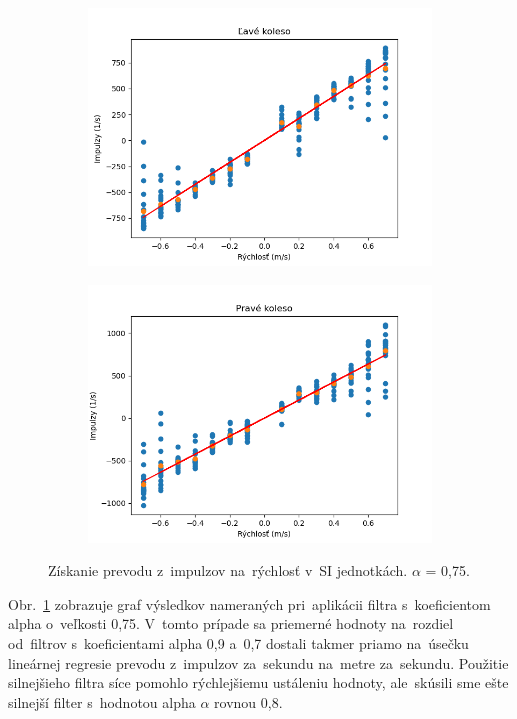 \begin{figure}[!htbp]
	\begin{subfigure}{0.5\textwidth}
		\includegraphics[width=\textwidth]{img/lw_075250.png}
	\end{subfigure}
	\hfill
	\begin{subfigure}{0.5\textwidth}
		\includegraphics[width=\textwidth]{img/rw_075250.png}
	\end{subfigure}
	\caption{Získanie prevodu z~impulzov na~rýchlosť v~SI jednotkách. \(\alpha\) = 0,75.}
	\label{fig:rw_lw_075250}
\end{figure}

Obr.~\ref{fig:rw_lw_075250} zobrazuje graf výsledkov nameraných pri~aplikácii filtra s~koeficientom alpha o~veľkosti 0,75.
V~tomto prípade sa priemerné hodnoty na~rozdiel od~filtrov s~koeficientami alpha 0,9 a~0,7 dostali takmer priamo na~úsečku
lineárnej regresie prevodu z~impulzov za~sekundu na~metre za~sekundu. Použitie silnejšieho filtra síce pomohlo rýchlejšiemu
ustáleniu hodnoty, ale~skúsili sme ešte silnejší filter s~hodnotou alpha $\alpha$ rovnou 0,8.

